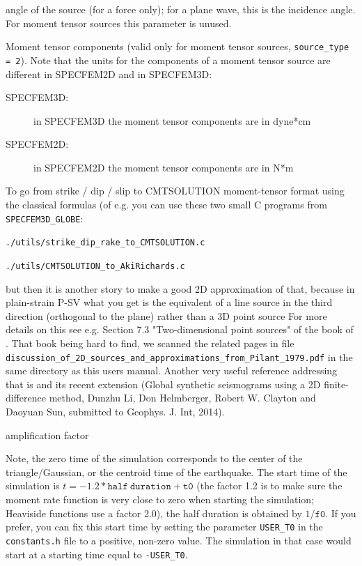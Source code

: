 \documentclass[oneside,english,onecolumn,letterpaper]{book}
\begin{document}
\begin{description}[font=\ttfamily]
\item[anglesource] angle of the source (for a force only); for a plane wave, this is the incidence angle. For moment tensor sources this parameter is unused.

\item[Mxx,Mzz,Mxz] Moment tensor components (valid only for moment tensor sources, \texttt{source\_type = 2}).
Note that the units for the components of a moment tensor source are different in SPECFEM2D and in SPECFEM3D:
%
\begin{description}
\item[SPECFEM3D:] in SPECFEM3D the moment tensor components are in dyne*cm
\item[SPECFEM2D:] in SPECFEM2D the moment tensor components are in N*m
\end{description}

To go from strike / dip / slip to CMTSOLUTION moment-tensor format using the classical formulas (of e.g. \cite{AkRi80} you can use these two small C programs from \texttt{SPECFEM3D\_GLOBE}:

\texttt{./utils/strike\_dip\_rake\_to\_CMTSOLUTION.c}

\texttt{./utils/CMTSOLUTION\_to\_AkiRichards.c}

but then it is another story to make a good 2D approximation of that, because in plain-strain P-SV what you get is the equivalent of a line source in the third direction (orthogonal to the plane) rather than a 3D point source
For more details on this see e.g. Section 7.3 "Two-dimensional point sources" of the book of \cite{Pil79}. That book being hard to find, we scanned the related pages in file\\
\texttt{discussion\_of\_2D\_sources\_and\_approximations\_from\_Pilant\_1979.pdf} in the same directory as this users manual.
Another very useful reference addressing that is \cite{HeVi88} and its recent extension 
(Global synthetic seismograms using a 2D finite-difference method,
Dunzhu Li, Don Helmberger, Robert W. Clayton and Daoyuan Sun, submitted to Geophys. J. Int, 2014).

\item[factor] amplification factor

\end{description}

Note, the zero time of the simulation corresponds to the center of the triangle/Gaussian,
or the centroid time of the earthquake. The start time of the simulation
is $t=-1.2*\mathtt{half~duration} + \mathtt{t0}$ (the factor 1.2 is to make sure the moment
rate function is very close to zero when starting the simulation; Heaviside functions use a factor 2.0),
the half duration is obtained by $1/\mathtt{f0}$.
If you prefer, you can fix this start time by setting the parameter \texttt{USER\_T0} in the \texttt{constants.h} file
to a positive, non-zero value. The simulation in that case would start at a starting time equal to \texttt{-USER\_T0}.
\end{document}

